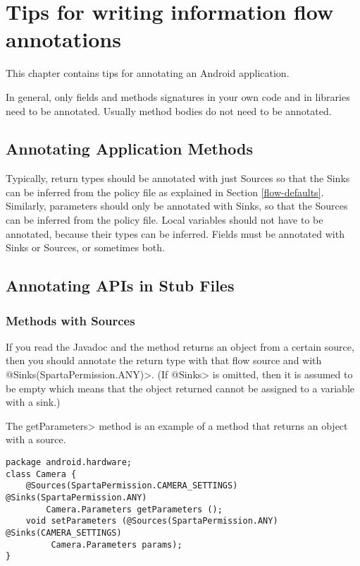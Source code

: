 \htmlhr
\chapter{Tips for writing information flow annotations\label{app-annotation}}

This chapter contains tips for annotating an Android application.

In general, only fields and methods signatures in your own code and in
libraries need to be annotated. Usually method bodies do not need to be
annotated.


\section{Annotating Application Methods\label{sec:annomethods}}

Typically, return types should be annotated with just Sources so that the Sinks can be
 inferred from the policy file as explained in Section \ref{flow-defaults}. Similarly, parameters should
  only be annotated with Sinks, so that the Sources can be inferred from  the policy file.
    Local variables should not have to be annotated, because their types can be inferred. Fields 
    must be annotated with  Sinks or Sources, or sometimes both. 

\section{Annotating APIs in Stub Files\label{sec:annoAPI}}

\subsection{Methods with Sources}
If you read the Javadoc and the method returns an object from a certain source, then you should annotate
the return type with that flow source and with \<@Sinks(SpartaPermission.ANY)>.  (If \<@Sinks> is omitted, then it is assumed to be empty
 which means that the object returned cannot be assigned to a variable with a sink.)

The \<getParameters> method is an example of a method that returns an object with a source.
\begin{Verbatim}
package android.hardware;
class Camera {
    @Sources(SpartaPermission.CAMERA_SETTINGS) @Sinks(SpartaPermission.ANY)
        Camera.Parameters getParameters ();
    void setParameters (@Sources(SpartaPermission.ANY) @Sinks(CAMERA_SETTINGS) 
         Camera.Parameters params);
}
\end{Verbatim}



